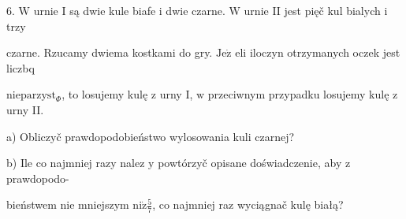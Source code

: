 \documentclass[a4paper,12pt]{article}
\begin{document}
6. $\mathrm{W}$ urnie I są dwie kule biafe $\mathrm{i}$ dwie czarne. $\mathrm{W}$ urnie II jest pięč kul bialych $\mathrm{i}$ trzy

czarne. Rzucamy dwiema kostkami do gry. $\mathrm{J}\mathrm{e}\dot{\mathrm{z}}$ eli iloczyn otrzymanych oczek jest liczbq

$\mathrm{n}\mathrm{i}\mathrm{e}\mathrm{p}\mathrm{a}\mathrm{r}\mathrm{z}\mathrm{y}\mathrm{s}\mathrm{t}_{\Phi}$, to losujemy kulę $\mathrm{z}$ urny I, $\mathrm{w}$ przeciwnym przypadku losujemy kulę $\mathrm{z}$ urny II.

a) Obliczyč prawdopodobieństwo wylosowania kuli czarnej?

b) Ile co najmniej razy nalez $\mathrm{y}$ powtórzyč opisane doświadczenie, aby $\mathrm{z}$ prawdopodo-

bieństwem nie mniejszym $\displaystyle \mathrm{n}\mathrm{i}\dot{\mathrm{z}}\frac{5}{7}$, co najmniej raz wyciągnač kulę białą?
\end{document}
